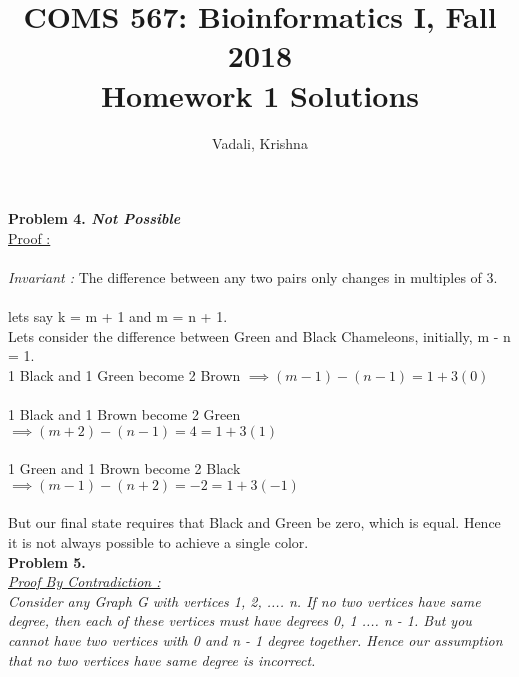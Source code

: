 \documentclass[11pt]{article}
\newcommand{\tab}{\hspace*{5mm}}
\begin{document}
   
\title{COMS 567: Bioinformatics I, Fall 2018\\
Homework 1 Solutions}
\author{Vadali, Krishna}
\date{}

\maketitle

{\bf Problem 4. \em Not Possible} \\ 
    \underline{Proof : } \\ \\
    {\em Invariant :}  The difference between any two pairs only changes in multiples of 3. \\ \\
    lets say k = m + 1 and m = n + 1. \\
    \tab Lets consider the difference between Green and Black Chameleons, initially, m - n = 1. \\
    1 Black and 1 Green become 2 Brown ${\implies (m - 1) - (n - 1) = 1 + 3 (0)}$\\ \\
    1 Black and 1 Brown become 2 Green ${\implies (m + 2) - (n - 1) = 4 = 1 + 3 (1)}$ \\ \\
    1 Green and 1 Brown become 2 Black ${\implies (m - 1) - (n + 2) = -2 = 1 + 3 (-1)}$ \\ \\
    But our final state requires that Black and Green be zero, which is equal. Hence it is not always possible to achieve a single color.\\

{\bf Problem 5.} \\ 
    \em \underline {Proof By Contradiction :} \\  \tab \tab Consider any Graph G with vertices {1, 2, .... n}. If no two vertices have same degree, then each of these vertices must have degrees {0, 1 .... n - 1}. But you cannot have two vertices with 0 and n - 1 degree together. Hence our assumption that no two vertices have same degree is incorrect.
\end{document}
